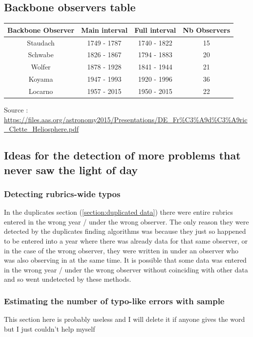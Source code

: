 \documentclass[12pt]{article}
\begin{document}
\subsection{Backbone observers table}

{\centering
\begin{tabular}{c|c|c|c}\label{table:backbone}
     Backbone Observer & Main interval & Full interval & Nb Observers  \\
     \hline
     Staudach & 1749 - 1787 & 1740 - 1822 & 15 \\
     Schwabe & 1826 - 1867 & 1794 - 1883 & 20 \\
     Wolfer & 1878 - 1928 & 1841 - 1944 & 21 \\
     Koyama & 1947 - 1993 & 1920 - 1996 & 36 \\
     Locarno & 1957 - 2015 & 1950 - 2015 & 22 \\
\end{tabular}
\par}
\footnotesize{Source : \href{https://files.aas.org/astronomy2015/Presentations/DE_Fr\%C3\%A9d\%C3\%A9ric_Clette_Heliosphere.pdf}{https://files.aas.org/astronomy2015/Presentations/DE_Fr\%C3\%A9d\%C3\%A9ric_Clette_Heliosphere.pdf}}

\subsection{Ideas for the detection of more problems that never saw the light of day}
\subsubsection{Detecting rubrics-wide typos}
In the duplicates section (\ref{section:duplicated data}) there were entire rubrics entered in the wrong year / under the wrong observer. The only reason they were detected by the duplicates finding algorithms was because they just so happened to be entered into a year where there was already data for that same observer, or in the case of the wrong observer, they were written in under an observer who was also observing in at the same time. It is possible that some data was entered in the wrong year / under the wrong observer without coinciding with other data and so went undetected by these methods.\\

\subsubsection{Estimating the number of typo-like errors with sample}
This section here is probably useless and I will delete it if anyone gives the word but I just couldn't help myself\\
\end{document}

